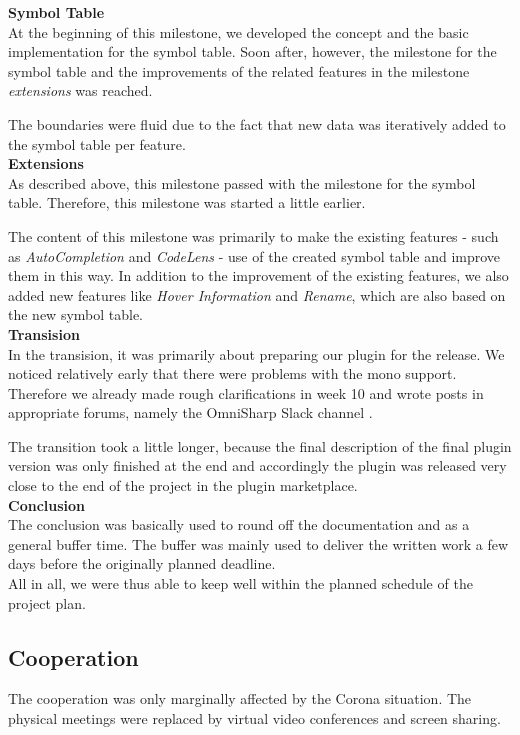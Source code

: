 {\bf Symbol Table}\\
At the beginning of this milestone,
we developed the concept and the basic implementation for the symbol table.
Soon after, however, the milestone for the symbol table
and the improvements of the related features in the milestone \textit{extensions} was reached.

The boundaries were fluid due to the fact that new data was iteratively added to the symbol table per feature. \\

{\bf Extensions}\\
As described above, this milestone passed with the milestone for the symbol table.
Therefore, this milestone was started a little earlier.

The content of this milestone was primarily to make the existing features
- such as \textit{AutoCompletion} and \textit{CodeLens} -
use of the created symbol table and improve them in this way.
In addition to the improvement of the existing features, we also
added new features like \textit{Hover Information} and \textit{Rename},
which are also based on the new symbol table.\\

{\bf Transision}\\
In the transision, it was primarily about preparing our plugin for the release.
We noticed relatively early that there were problems with the mono support.
Therefore we already made rough clarifications in week 10 and wrote posts in appropriate forums,
namely the OmniSharp Slack channel \cite{mono-slack}.

The transition took a little longer, because the final description of the final plugin version was only
finished at the end and accordingly the plugin was released very close to the end of the project in the plugin marketplace.\\

{\bf Conclusion}\\
The conclusion was basically used to round off the documentation and as a general buffer time.
The buffer was mainly used to deliver the written work a few days before the originally planned deadline.\\

All in all, we were thus able to keep well within the planned schedule of the project plan.

\subsection{Cooperation}
The cooperation was only marginally affected by the Corona situation.
The physical meetings were replaced by virtual video conferences and screen sharing.

